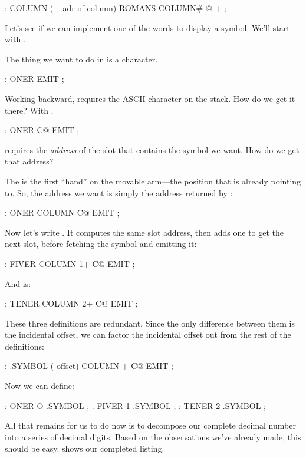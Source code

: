 \begin{Code}
: COLUMN  ( -- adr-of-column)  ROMANS  COLUMN# @  + ;
\end{Code}
Let's see if we can implement one of the words to display a symbol. We'll
start with .

The thing we want to do in  is  a character.

\begin{Code}
: ONER                   EMIT ;
\end{Code}
Working backward,  requires the ASCII character on the stack.
How do we get it there? With .

\begin{Code}
: ONER                C@ EMIT ;
\end{Code}
 requires the \emph{address} of the slot that contains the
symbol we want. How do we get that address?

The  is the first ``hand'' on the movable arm---the position
that  is already pointing to. So, the address we want is
simply the address returned by :

\begin{Code}
: ONER   COLUMN       C@ EMIT ;
\end{Code}
Now let's write . It computes the same slot address, then
adds one to get the next slot, before fetching the symbol and emitting it:

\begin{Code}
: FIVER  COLUMN 1+    C@ EMIT ;
\end{Code}
And  is:

\begin{Code}
: TENER  COLUMN 2+    C@ EMIT ;
\end{Code}
These three definitions are redundant. Since the only difference between
them is the incidental offset, we can factor the incidental offset out
from the rest of the definitions:

\begin{Code}
: .SYMBOL  ( offset)  COLUMN +  C@ EMIT ;
\end{Code}
Now we can define:

\begin{Code}
: ONER    O .SYMBOL ;
: FIVER   1 .SYMBOL ;
: TENER   2 .SYMBOL ;
\end{Code}
All that remains for us to do now is to decompose our complete decimal
number into a series of decimal digits. Based on the observations we've
already made, this should be easy.  shows our completed
listing.

